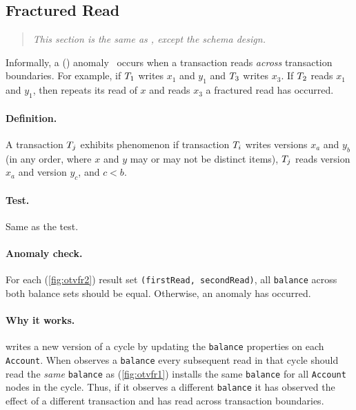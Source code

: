 \subsection{Fractured Read}
\label{sec:fractured-reads}

\begin{quote}
  \textit{This section is the same as \ldbcsnb, except the schema design.}
\end{quote}

Informally, a  ()
anomaly~\cite{DBLP:journals/tods/BailisFGHS16} occurs when a transaction reads
\emph{across} transaction boundaries. For example, if $T_1$ writes $x_1$
and $y_1$ and $T_3$ writes $x_3$. If $T_2$ reads $x_1$ and $y_1$, then
repeats its read of $x$ and reads $x_3$ a fractured read has occurred.

\paragraph{Definition.}
A transaction $T_j$ exhibits phenomenon  if transaction
$T_i$ writes versions $x_a$ and $y_b$ (in any order, where $x$ and $y$ may
or may not be distinct items), $T_j$ reads version $x_a$ and version $y_c$,
and $c < b$.

\paragraph{Test.}
Same as the  test.

\paragraph{Anomaly check.}
For each   (\autoref{fig:otvfr2}) result set
\texttt{(firstRead, secondRead)}, all \texttt{balance} across both balance sets
should be equal. Otherwise, an  anomaly has occurred.

\paragraph{Why it works.}
 writes a new version of a cycle by updating the
\texttt{balance} properties on each \texttt{Account}. When 
observes a \texttt{balance} every subsequent read in that cycle should read the
\emph{same} \texttt{balance} as  (\autoref{fig:otvfr1})
installs the same \texttt{balance} for all \texttt{Account} nodes in the cycle.
Thus, if it observes a different \texttt{balance} it has observed the effect of
a different transaction and has read across transaction boundaries.


